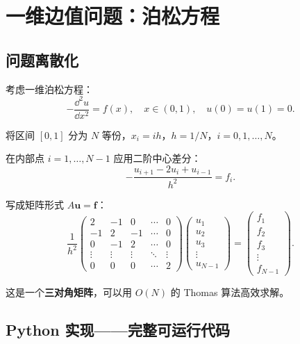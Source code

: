 \section{一维边值问题：泊松方程}
\label{sec:poisson1d}

\subsection{问题离散化}

考虑一维泊松方程：
\begin{equation}
-\frac{\dd^2 u}{\dd x^2} = f(x),\quad x\in(0,1),\quad u(0)=u(1)=0.
\label{eq:poisson1d}
\end{equation}

将区间 $[0,1]$ 分为 $N$ 等份，$x_i = i h$，$h=1/N$，$i=0,1,\dots,N$。

在内部点 $i=1,\dots,N-1$ 应用二阶中心差分：
\begin{equation}
-\frac{u_{i+1} - 2u_i + u_{i-1}}{h^2} = f_i.
\label{eq:poisson_discrete}
\end{equation}

写成矩阵形式 $A\mathbf{u} = \mathbf{f}$：
\begin{equation}
\frac{1}{h^2}\begin{pmatrix}
2 & -1 & 0 & \cdots & 0 \\
-1 & 2 & -1 & \cdots & 0 \\
0 & -1 & 2 & \cdots & 0 \\
\vdots & \vdots & \vdots & \ddots & \vdots \\
0 & 0 & 0 & \cdots & 2
\end{pmatrix}
\begin{pmatrix} u_1 \\ u_2 \\ u_3 \\ \vdots \\ u_{N-1} \end{pmatrix}
= \begin{pmatrix} f_1 \\ f_2 \\ f_3 \\ \vdots \\ f_{N-1} \end{pmatrix}.
\label{eq:poisson_matrix}
\end{equation}

这是一个\textbf{三对角矩阵}，可以用 $O(N)$ 的 Thomas 算法高效求解。

\subsection{Python 实现——完整可运行代码}

